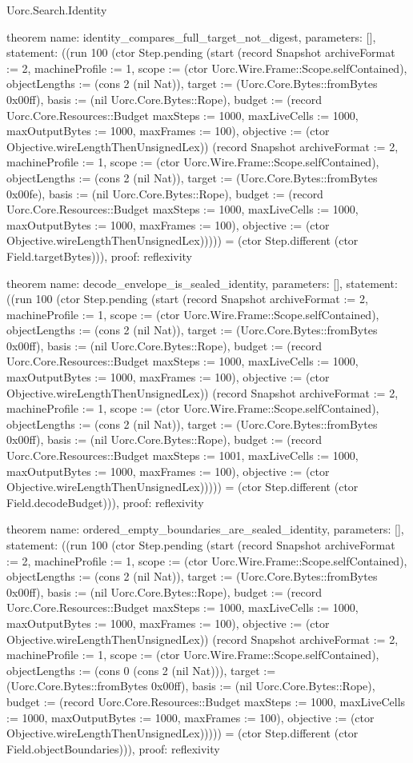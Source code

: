 \begin{lexlean}{Uorc.Search.Identity}
\begin{semanticmodule}
theorem{
  name: identity_compares_full_target_not_digest,
  parameters: [],
  statement: ((run 100 (ctor Step.pending (start (record Snapshot {archiveFormat := 2, machineProfile := 1, scope := (ctor Uorc.Wire.Frame::Scope.selfContained), objectLengths := (cons 2 (nil Nat)), target := (Uorc.Core.Bytes::fromBytes 0x00ff), basis := (nil Uorc.Core.Bytes::Rope), budget := (record Uorc.Core.Resources::Budget {maxSteps := 1000, maxLiveCells := 1000, maxOutputBytes := 1000, maxFrames := 100}), objective := (ctor Objective.wireLengthThenUnsignedLex)}) (record Snapshot {archiveFormat := 2, machineProfile := 1, scope := (ctor Uorc.Wire.Frame::Scope.selfContained), objectLengths := (cons 2 (nil Nat)), target := (Uorc.Core.Bytes::fromBytes 0x00fe), basis := (nil Uorc.Core.Bytes::Rope), budget := (record Uorc.Core.Resources::Budget {maxSteps := 1000, maxLiveCells := 1000, maxOutputBytes := 1000, maxFrames := 100}), objective := (ctor Objective.wireLengthThenUnsignedLex)})))) = (ctor Step.different (ctor Field.targetBytes))),
  proof: reflexivity{}
}

theorem{
  name: decode_envelope_is_sealed_identity,
  parameters: [],
  statement: ((run 100 (ctor Step.pending (start (record Snapshot {archiveFormat := 2, machineProfile := 1, scope := (ctor Uorc.Wire.Frame::Scope.selfContained), objectLengths := (cons 2 (nil Nat)), target := (Uorc.Core.Bytes::fromBytes 0x00ff), basis := (nil Uorc.Core.Bytes::Rope), budget := (record Uorc.Core.Resources::Budget {maxSteps := 1000, maxLiveCells := 1000, maxOutputBytes := 1000, maxFrames := 100}), objective := (ctor Objective.wireLengthThenUnsignedLex)}) (record Snapshot {archiveFormat := 2, machineProfile := 1, scope := (ctor Uorc.Wire.Frame::Scope.selfContained), objectLengths := (cons 2 (nil Nat)), target := (Uorc.Core.Bytes::fromBytes 0x00ff), basis := (nil Uorc.Core.Bytes::Rope), budget := (record Uorc.Core.Resources::Budget {maxSteps := 1001, maxLiveCells := 1000, maxOutputBytes := 1000, maxFrames := 100}), objective := (ctor Objective.wireLengthThenUnsignedLex)})))) = (ctor Step.different (ctor Field.decodeBudget))),
  proof: reflexivity{}
}

theorem{
  name: ordered_empty_boundaries_are_sealed_identity,
  parameters: [],
  statement: ((run 100 (ctor Step.pending (start (record Snapshot {archiveFormat := 2, machineProfile := 1, scope := (ctor Uorc.Wire.Frame::Scope.selfContained), objectLengths := (cons 2 (nil Nat)), target := (Uorc.Core.Bytes::fromBytes 0x00ff), basis := (nil Uorc.Core.Bytes::Rope), budget := (record Uorc.Core.Resources::Budget {maxSteps := 1000, maxLiveCells := 1000, maxOutputBytes := 1000, maxFrames := 100}), objective := (ctor Objective.wireLengthThenUnsignedLex)}) (record Snapshot {archiveFormat := 2, machineProfile := 1, scope := (ctor Uorc.Wire.Frame::Scope.selfContained), objectLengths := (cons 0 (cons 2 (nil Nat))), target := (Uorc.Core.Bytes::fromBytes 0x00ff), basis := (nil Uorc.Core.Bytes::Rope), budget := (record Uorc.Core.Resources::Budget {maxSteps := 1000, maxLiveCells := 1000, maxOutputBytes := 1000, maxFrames := 100}), objective := (ctor Objective.wireLengthThenUnsignedLex)})))) = (ctor Step.different (ctor Field.objectBoundaries))),
  proof: reflexivity{}
}


\end{semanticmodule}
\end{lexlean}
